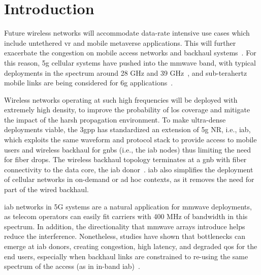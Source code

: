 


\section{Introduction}
\label{sec:intro}

Future wireless networks will accommodate data-rate intensive use cases which include untethered \gls{vr} and mobile metaverse applications. This will further exacerbate the congestion on mobile access networks and backhaul systems~\cite{holo1}. For this reason, \gls{5g} cellular systems have pushed into the \gls{mmwave} band, with typical deployments in the spectrum around 28 GHz and 39 GHz~\cite{shafi2017deployment}, and sub-terahertz mobile links are being considered for \gls{6g} applications~\cite{polese2020toward,8869705}.

Wireless networks operating at such high frequencies will be deployed with extremely high density, to improve the probability of \gls{los} coverage and mitigate the impact of the harsh propagation environment. To make ultra-dense deployments viable, the \gls{3gpp} has standardized an extension of \gls{5g} NR, i.e., \gls{iab}, which exploits the same waveform and protocol stack to provide access to mobile users and wireless backhaul for \glspl{gnb} (i.e., the \gls{iab} nodes) thus limiting the need for fiber drops. The wireless backhaul topology terminates at a \gls{gnb} with fiber connectivity to the data core, the \gls{iab} donor~\cite{9187867,stoch_geom2,3gpp_38_174}. \gls{iab} also simplifies the deployment of cellular networks in on-demand or ad hoc contexts, as it removes the need for part of the wired backhaul.

\gls{iab} networks in 5G systems are a natural application for \gls{mmwave} deployments, as telecom operators can easily fit carriers with 400 MHz of bandwidth in this spectrum. In addition, the directionality that \gls{mmwave} arrays introduce helps reduce the interference. Nonetheless, studies have shown that bottlenecks can emerge at \gls{iab} donors, creating congestion, high latency, and degraded \gls{qos} for the end users, especially when backhaul links are constrained to re-using the same spectrum of the access (as in in-band \gls{iab})~\cite{polese2020integrated}.

